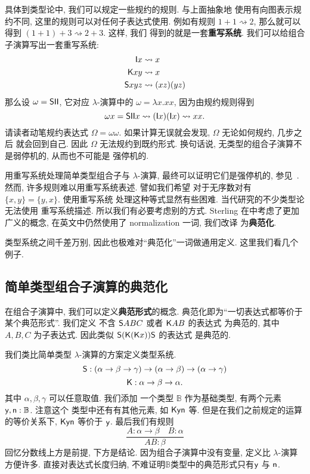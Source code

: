 具体到类型论中, 我们可以规定一些规约的规则. 与上面抽象地
使用有向图表示规约不同, 这里的规则可以对任何子表达式使用.
例如有规则 \(1 + 1 \rightsquigarrow 2\), 那么就可以
得到 \((1+1)+3 \rightsquigarrow 2 + 3\). 这样, 我们
得到的就是一套\textbf{重写系统}. 我们可以给组合子演算写出一套重写系统:
\[\begin{aligned}
\textnormal{\textsf{I}}x & \rightsquigarrow x\\
\textnormal{\textsf{K}}xy &\rightsquigarrow x\\
\textnormal{\textsf{S}}xyz &\rightsquigarrow (xz)(yz)
\end{aligned}\]
那么设 \(\omega = \textnormal{\textsf{S}}\textnormal{\textsf{I}}\textnormal{\textsf{I}}\),
它对应 \(\lambda\)-演算中的 \(\omega = \lambda x. xx\),
因为由规约规则得到
\[\omega x = \textnormal{\textsf{S}}\textnormal{\textsf{I}}\textnormal{\textsf{I}}x \rightsquigarrow (\textnormal{\textsf{I}}x)(\textnormal{\textsf{I}}x) \rightsquigarrow xx.\]
请读者动笔规约表达式 \(\Omega = \omega\omega\).
如果计算无误就会发现, \(\Omega\) 无论如何规约, 几步之后
就会回到自己. 因此 \(\Omega\) 无法规约到既约形式.
换句话说, 无类型的组合子演算不是弱停机的, 从而也不可能是
强停机的.

用重写系统处理简单类型组合子与 \(\lambda\)-演算,
最终可以证明它们是强停机的, 参见~\cite{loader:1998:stlc}.
然而, 许多规则难以用重写系统表述. 譬如我们希望
对于无序数对有 \(\{x,y\} = \{y,x\}\). 使用重写系统
处理这种等式显然有些困难. 当代研究的不少类型论无法使用
重写系统描述. 所以我们有必要考虑别的方式. Sterling
在\cite{sterling:2021:thesis}中考虑了更加广义的概念,
在英文中仍然使用了 normalization 一词, 我们改译
为\textbf{典范化}.

类型系统之间千差万别, 因此也极难对“典范化”一词做通用定义.
这里我们看几个例子.

\subsection{简单类型组合子演算的典范化}
在组合子演算中, 我们可以定义\textbf{典范形式}的概念.
典范化即为“一切表达式都等价于某个典范形式”. 我们定义
不含 \(\textnormal{\textsf{S}}ABC\) 或者 \(\textnormal{\textsf{K}}AB\) 的表达式
为典范的, 其中 \(A,B,C\) 为子表达式. 因此类似
\(\textnormal{\textsf{S}}(\textnormal{\textsf{K}}(\textnormal{\textsf{K}}x))\textnormal{\textsf{S}}\) 的表达式
是典范的.

我们类比简单类型 \(\lambda\)-演算的方案定义类型系统.
\[\textnormal{\textsf{S}} : (\alpha \to \beta \to \gamma)
\to (\alpha \to \beta) \to (\alpha \to \gamma)\]
\[\textnormal{\textsf{K}} : \alpha \to \beta \to \alpha.\]
其中 \(\alpha,\beta,\gamma\) 可以任意取值. 我们添加
一个类型 \(\mathbb B\) 作为基础类型, 有两个元素
\(\textnormal{\textsf{y}}, \textnormal{\textsf{n}} : \mathbb B\). 注意这个
类型中还有有其他元素, 如 \(\textnormal{\textsf{K}}\textnormal{\textsf{y}}\textnormal{\textsf{n}}\) 等.
但是在我们之前规定的运算的等价关系下, \(\textnormal{\textsf{K}}\textnormal{\textsf{y}}\textnormal{\textsf{n}}\) 等价于 \(\textnormal{\textsf{y}}\).
最后我们有规则
\[\frac{A : \alpha \to \beta \quad B : \alpha}{AB : \beta}\]
回忆分数线上方是前提, 下方是结论. 因为组合子演算中没有变量,
定义比 \(\lambda\)-演算方便许多. 直接对表达式长度归纳,
不难证明\(\mathbb B\)类型中的典范形式只有\(\textnormal{\textsf{y}}\)
与 \(\textnormal{\textsf{n}}\).

